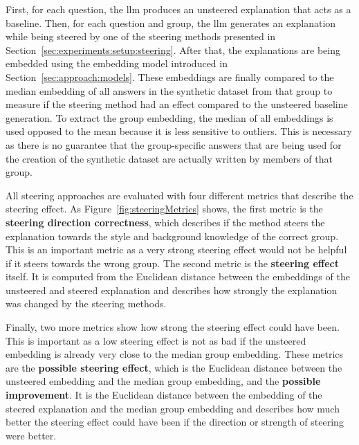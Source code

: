 First, for each question, the \ac{llm} produces an unsteered explanation that acts as a baseline.
Then, for each  question and group, the \ac{llm} generates an explanation while being steered by one of the steering methods presented in Section~\ref{sec:experiments:setup:steering}. After that, the explanations are being embedded using the embedding model introduced in Section~\ref{sec:approach:models}. These embeddings are finally compared to the median embedding of all answers in the synthetic dataset from that group to measure if the steering method had an effect compared to the unsteered baseline generation.
To extract the group embedding, the median of all embeddings is used opposed to the mean because it is less sensitive to outliers. This is necessary as there is no guarantee that the group-specific answers that are being used for the creation of the synthetic dataset are actually written by members of that group.

All steering approaches are evaluated with four different metrics that describe the steering effect. As Figure~\ref{fig:steeringMetrics} shows, the first metric is the \textbf{steering direction correctness}, which describes if the method steers the explanation towards the style and background knowledge of the correct group. This is an important metric as a very strong steering effect would not be helpful if it steers towards the wrong group. The second metric is the \textbf{steering effect} itself. It is computed from the Euclidean distance between the embeddings of the unsteered and steered explanation and describes how strongly the explanation was changed by the steering methods.

Finally, two more metrics show how strong the steering effect could have been. This is important as a low steering effect is not as bad if the unsteered embedding is already very close to the median group embedding. These metrics are the \textbf{possible steering effect}, which is the Euclidean distance between the unsteered embedding and the median group embedding, and the \textbf{possible improvement}. It is the Euclidean distance between the embedding of the steered explanation and the median group embedding and describes how much better the steering effect could have been if the direction or strength of steering were better.



